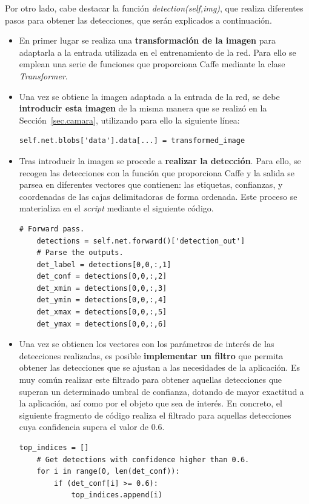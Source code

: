 Por otro lado, cabe destacar la función \textit{detection(self,img)}, que realiza diferentes pasos para obtener las detecciones, que serán explicados a continuación.

\begin{itemize}
	\item En primer lugar se realiza una \textbf{transformación de la imagen} para adaptarla a la entrada utilizada en el entrenamiento de la red. Para ello se emplean una serie de funciones que proporciona Caffe mediante la clase \textit{Transformer}.
	\item Una vez se obtiene la imagen adaptada a la entrada de la red, se debe \textbf{introducir esta imagen } de la misma manera que se realizó en la Sección~\ref{sec.camara}, utilizando para ello la siguiente línea:
	\vspace{10pt}
	\begin{lstlisting}[frame=single]
	self.net.blobs['data'].data[...] = transformed_image
	\end{lstlisting}
	\item Tras introducir la imagen se procede a \textbf{realizar la detección}. Para ello, se recogen las detecciones con la función que proporciona Caffe y la salida se parsea en diferentes vectores que contienen: las etiquetas, confianzas, y coordenadas de las cajas delimitadoras de forma ordenada. Este proceso se materializa en el \textit{script} mediante el siguiente código.
	\vspace{10pt}
	\begin{lstlisting}[frame=single]
	# Forward pass.
	detections = self.net.forward()['detection_out']
	# Parse the outputs.
	det_label = detections[0,0,:,1]
	det_conf = detections[0,0,:,2]
	det_xmin = detections[0,0,:,3]
	det_ymin = detections[0,0,:,4]
	det_xmax = detections[0,0,:,5]
	det_ymax = detections[0,0,:,6]
	\end{lstlisting}
	\item Una vez se obtienen los vectores con los parámetros de interés de las detecciones realizadas, es posible \textbf{implementar un filtro} que permita obtener las detecciones que se ajustan a las necesidades de la aplicación. Es muy común realizar este filtrado para obtener aquellas detecciones que superan un determinado umbral de confianza, dotando de mayor exactitud a la aplicación, así como por el objeto que sea de interés. En concreto, el siguiente fragmento de código realiza el filtrado para aquellas detecciones cuya confidencia supera el valor de 0.6.
	\begin{lstlisting}[frame=single]
	top_indices = []
	# Get detections with confidence higher than 0.6.
	for i in range(0, len(det_conf)):
		if (det_conf[i] >= 0.6):
			top_indices.append(i)


\end{lstlisting}
\end{itemize}
